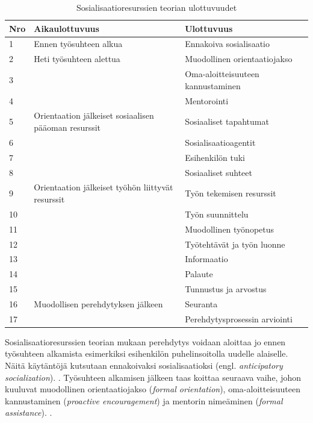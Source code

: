 \documentclass[utf8]{gradu3}
\begin{document}
\begin{table}[h]
    \footnotesize
    \begin{tabular}{llll}
        \toprule
        \textbf{Nro} & \textbf{Aikaulottuvuus} & \textbf{Ulottuvuus} \\
        \toprule
        1 & Ennen työsuhteen alkua & Ennakoiva sosialisaatio \\
        \midrule
        2 & Heti työsuhteen alettua & Muodollinen orientaatiojakso \\
        3 & & Oma-aloitteisuuteen kannustaminen \\
        4 & & Mentorointi \\
        \midrule
        5 & Orientaation jälkeiset sosiaalisen pääoman resurssit & Sosiaaliset tapahtumat \\
        6 & & Sosialisaatioagentit \\
        7 & & Esihenkilön tuki \\
        8 & & Sosiaaliset suhteet \\
        \midrule
        9 & Orientaation jälkeiset työhön liittyvät resurssit & Työn tekemisen resurssit \\
        10 &&  Työn suunnittelu \\
        11 && Muodollinen työnopetus \\
        12 && Työtehtävät ja työn luonne \\
        13 && Informaatio \\
        14 && Palaute \\
        15 && Tunnustus ja arvostus \\
        \midrule
        16 & Muodollisen perehdytyksen jälkeen & Seuranta \\
        17 && Perehdytysprosessin arviointi \\
        \bottomrule
    \end{tabular}
    \caption{Sosialisaatioresurssien teorian ulottuvuudet \parencite{saks-gruman-2012}}
    \label{tbl:srt-ulottuvuudet}
\end{table}

Sosialisaatioresurssien teorian mukaan perehdytys voidaan aloittaa jo ennen työsuhteen alkamista esimerkiksi esihenkilön puhelinsoitolla uudelle alaiselle. Näitä käytäntöjä kutsutaan ennakoivaksi sosialisaatioksi (engl. \textit{anticipatory socialization}). \parencite{saks-gruman-2012}. Työsuhteen alkamisen jälkeen taas koittaa seuraava vaihe, johon kuuluvat muodollinen orientaatiojakso (\textit{formal orientation}), oma-aloitteisuuteen kannustaminen (\textit{proactive encouragement}) ja mentorin nimeäminen (\textit{formal assistance}). \parencite{saks-gruman-2012}.
\end{document}
